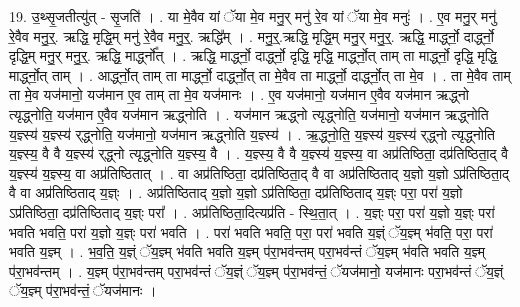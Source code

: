 \documentclass[17pt]{extarticle}
\begin{document}
19. उ॒थ्सृ॒जतीत्यु॑त् - सृ॒जति॑ । . या मे॒वैव यां ॅया मे॒व मनु॒र् मनु॑ रे॒व यां ॅया मे॒व मनुः॑ । . ए॒व मनु॒र् मनु॑ रे॒वैव मनु॒र्॒. ऋद्धि॒ मृद्धि॒म् मनु॑ रे॒वैव मनु॒र्॒. ऋद्धि᳚म् । . मनु॒र्॒.ऋद्धि॒ मृद्धि॒म् मनु॒र् मनु॒र्॒. ऋद्धि॒ मार्द्ध्नो॒ दार्द्ध्नो॒ दृद्धि॒म् मनु॒र् मनु॒र्॒. ऋद्धि॒ मार्द्ध्नो᳚त् । . ऋद्धि॒ मार्द्ध्नो॒ दार्द्ध्नो॒ दृद्धि॒ मृद्धि॒ मार्द्ध्नो॒त् ताम् ता मार्द्ध्नो॒ दृद्धि॒ मृद्धि॒ मार्द्ध्नो॒त् ताम् । . आर्द्ध्नो॒त् ताम् ता मार्द्ध्नो॒ दार्द्ध्नो॒त् ता मे॒वैव ता मार्द्ध्नो॒ दार्द्ध्नो॒त् ता मे॒व । . ता मे॒वैव ताम् ता मे॒व यज॑मानो॒ यज॑मान ए॒व ताम् ता मे॒व यज॑मानः । . ए॒व यज॑मानो॒ यज॑मान ए॒वैव यज॑मान ऋद्ध्नो त्यृद्ध्नोति॒ यज॑मान ए॒वैव यज॑मान ऋद्ध्नोति । . यज॑मान ऋद्ध्नो त्यृद्ध्नोति॒ यज॑मानो॒ यज॑मान ऋद्ध्नोति य॒ज्ञ्स्य॑ य॒ज्ञ्स्य॑ र्‌द्ध्नोति॒ यज॑मानो॒ यज॑मान ऋद्ध्नोति य॒ज्ञ्स्य॑ । . ऋ॒द्ध्नो॒ति॒ य॒ज्ञ्स्य॑ य॒ज्ञ्स्य॑ र्‌द्ध्नो त्यृद्ध्नोति य॒ज्ञ्स्य॒ वै वै य॒ज्ञ्स्य॑ र्‌द्ध्नो त्यृद्ध्नोति य॒ज्ञ्स्य॒ वै । . य॒ज्ञ्स्य॒ वै वै य॒ज्ञ्स्य॑ य॒ज्ञ्स्य॒ वा अप्र॑तिष्ठिता॒ दप्र॑तिष्ठिता॒द् वै य॒ज्ञ्स्य॑ य॒ज्ञ्स्य॒ वा अप्र॑तिष्ठितात् । . वा अप्र॑तिष्ठिता॒ दप्र॑तिष्ठिता॒द् वै वा अप्र॑तिष्ठिताद् य॒ज्ञो य॒ज्ञो ऽप्र॑तिष्ठिता॒द् वै वा अप्र॑तिष्ठिताद् य॒ज्ञ्ः । . अप्र॑तिष्ठिताद् य॒ज्ञो य॒ज्ञो ऽप्र॑तिष्ठिता॒ दप्र॑तिष्ठिताद् य॒ज्ञ्ः परा॒ परा॑ य॒ज्ञो ऽप्र॑तिष्ठिता॒ दप्र॑तिष्ठिताद् य॒ज्ञ्ः परा᳚ । . अप्र॑तिष्ठिता॒दित्यप्र॑ति - स्थि॒ता॒त् । . य॒ज्ञ्ः परा॒ परा॑ य॒ज्ञो य॒ज्ञ्ः परा॑ भवति भवति॒ परा॑ य॒ज्ञो य॒ज्ञ्ः परा॑ भवति । . परा॑ भवति भवति॒ परा॒ परा॑ भवति य॒ज्ञ्ं ॅय॒ज्ञ्म् भ॑वति॒ परा॒ परा॑ भवति य॒ज्ञ्म् । . भ॒व॒ति॒ य॒ज्ञ्ं ॅय॒ज्ञ्म् भ॑वति भवति य॒ज्ञ्म् प॑रा॒भव॑न्तम् परा॒भव॑न्तं ॅय॒ज्ञ्म् भ॑वति भवति य॒ज्ञ्म् प॑रा॒भव॑न्तम् । . य॒ज्ञ्म् प॑रा॒भव॑न्तम् परा॒भव॑न्तं ॅय॒ज्ञ्ं ॅय॒ज्ञ्म् प॑रा॒भव॑न्तं॒ ॅयज॑मानो॒ यज॑मानः परा॒भव॑न्तं ॅय॒ज्ञ्ं ॅय॒ज्ञ्म् प॑रा॒भव॑न्तं॒ ॅयज॑मानः । \newline
\end{document}
